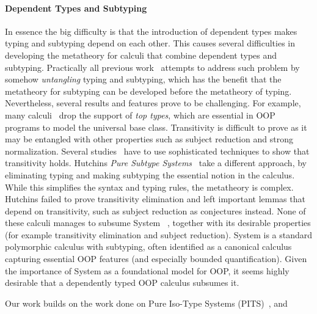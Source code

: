 \paragraph{Dependent Types and Subtyping}
In essence the big difficulty is that the introduction of dependent
types makes typing and subtyping depend on each other. This causes
several difficulties in developing the metatheory for calculi that
combine dependent types and subtyping. Practically all previous
work~\cite{subdep,ptssub,chen1,cocsub,Chen03coc} attempts to address such problem by somehow
\emph{untangling} typing and subtyping, which has the benefit that the
metatheory for subtyping can be developed before the metatheory of
typing. Nevertheless, several results and features prove to be
challenging. For example, many calculi~\cite{subdep,ptssub}
drop the support of \emph{top types}, which are essential in OOP
programs to model the universal base class. Transitivity is difficult
to prove as it may be entangled with other properties such as
subject reduction and strong normalization.
Several studies~\cite{subdep,chen1} have
to use sophisticated techniques to show that transitivity
holds. Hutchins \emph{Pure
  Subtype Systems}~\cite{hutchins} take a different approach, by
eliminating typing and making subtyping the essential notion in the
calculus.  While this simplifies the syntax and typing rules, the metatheory is complex. Hutchins failed
to prove transitivity elimination and left
important lemmas that depend on transitivity, such as
subject reduction as
conjectures instead.
None of these calculi manages to subsume
System \fsub~\cite{fsub}, together with its desirable properties (for
example transitivity elimination and subject reduction). System
\fsub is a standard polymorphic calculus with subtyping, often
identified as a canonical calculus capturing
essential OOP features (and especially bounded quantification).
Given the importance of System \fsub as a foundational
model for OOP, it seems highly desirable that a dependently
typed OOP calculus subsumes it.

Our work builds on the work done on Pure Iso-Type Systems (PITS)~\cite{yang2019pure}, and

